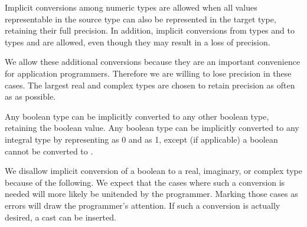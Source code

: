 Implicit conversions among numeric types are allowed when
all values representable in the source type can also be represented
in the target type, retaining their full precision.
%
%
In addition, implicit conversions from
types  and  to types 
and  are allowed, even though they may result in a loss of
precision.


\begin{rationale}
We allow these additional conversions because they are an important
convenience for application programmers. Therefore we are willing to
lose precision in these cases. The largest real and complex types
are chosen to retain precision as often as as possible.
\end{rationale}

Any boolean type can be implicitly converted to any other boolean type,
retaining the boolean value.
Any boolean type can be implicitly converted to any integral type
by representing  as 0 and  as 1,
except (if applicable)
a boolean cannot be converted to .

\begin{rationale}
We disallow implicit conversion of a boolean to
a real, imaginary, or complex type because of the following.
We expect that the cases where such a conversion is needed
will more likely be unitended by the programmer.
Marking those cases as errors will draw the programmer's attention.
If such a conversion is actually desired, a cast 
can be inserted.
\end{rationale}

